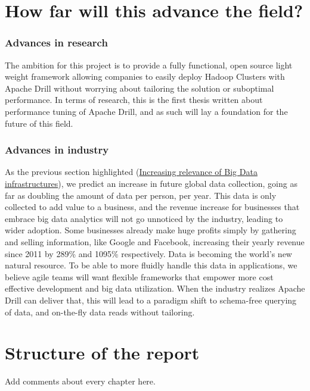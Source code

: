 \documentclass[a4paper,english]{report}
\begin{document}
		\section{How far will this advance the field?}
			\subsubsection{Advances in research}
			The ambition for this project is to provide a fully functional, open source light weight framework allowing companies to easily deploy Hadoop Clusters with Apache Drill without worrying about tailoring the solution or suboptimal performance. In terms of research, this is the first thesis written about performance tuning of Apache Drill, and as such will lay a foundation for the future of this field.
			\subsubsection{Advances in industry}
			As the previous section highlighted (\hyperref[big_data]{Increasing relevance of Big Data infrastructures}), we predict an increase in future global data collection, going as far as doubling the amount of data per person, per year. This data is only collected to add value to a business, and the revenue increase for businesses that embrace big data analytics will not go unnoticed by the industry, leading to wider adoption. Some businesses already make huge profits simply by gathering and selling information, like Google and Facebook, increasing their yearly revenue since 2011 by 289\% and 1095\% respectively\cite{statista}. Data is becoming the world’s new natural resource\cite{future_data}. To be able to more fluidly handle this data in applications, we believe agile teams will want flexible frameworks that empower more cost effective development and big data utilization. When the industry realizes Apache Drill can deliver that, this will lead to a paradigm shift to schema-free querying of data, and on-the-fly data reads without tailoring.
		
		\section{Structure of the report}
		Add comments about every chapter here.

		
\end{document}
